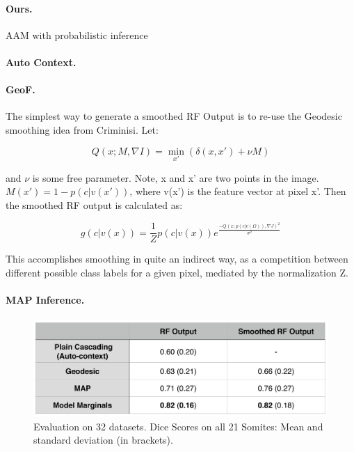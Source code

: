 \documentclass[10pt,twocolumn,letterpaper]{article}
\begin{document}
\paragraph{Ours. }
AAM with probabilistic inference 

\paragraph{Auto Context. }

\paragraph{GeoF. }
The simplest way to generate a smoothed RF Output is to re-use the Geodesic smoothing idea from Criminisi.  Let:

\[ Q(x; M, \nabla I) = \min_{x'} (\delta (x,x') + \nu M) \]

and $\nu$ is some free parameter.  Note, x and x' are two points in the image. $M(x') = 1 - p(c|v(x'))$, where v(x') is the feature vector at pixel x'.  Then the smoothed RF output is calculated as:

\[ g(c|v(x)) = \frac{1}{Z} p(c|v(x)) e^{\frac{-Q(x;p(c|v(\Omega)),\nabla J)^2}{\sigma ^2}} \]

This accomplishes smoothing in quite an indirect way, as a competition between different possible class labels for a given pixel, mediated by the normalization Z.  

\paragraph{MAP Inference. }

\begin{figure}[t]
\begin{center}
\includegraphics[width=\columnwidth]{TableDiceScores_2columns_noGeoF2.jpg} %
\caption{Evaluation on 32 datasets. Dice Scores on all 21 Somites: Mean and standard deviation (in brackets).}
\label{tab:results}
\end{center}
\end{figure}
\end{document}
